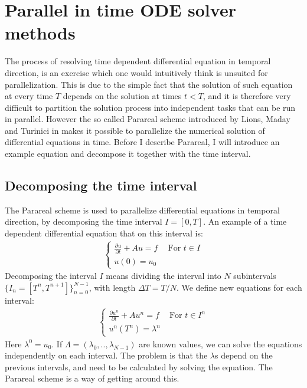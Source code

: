 \chapter{Parallel in time ODE solver methods} \label{parareal_chap}
The process of resolving time dependent differential equation in temporal direction, is an exercise which one would intuitively think is unsuited for parallelization. This is due to the simple fact that the solution of such equation at every time $T$ depends on the solution at times $t<T$, and it is therefore very difficult to partition the solution process into independent tasks that can be run in parallel. However the so called Parareal scheme introduced by Lions, Maday and Turinici in \cite{lions2001resolution} makes it possible to parallelize the numerical solution of differential equations in time. Before I describe Parareal, I will introduce an example equation and decompose it together with the time interval.
\section{Decomposing the time interval}
The Parareal scheme is used to parallelize differential equations in temporal direction, by decomposing the time interval $I=[0,T]$. An example of a time dependent differential equation that on this interval is:
\begin{align}
\left\{
   	\begin{array}{lr}
		\frac{\partial u}{\partial t} + Au = f \ \quad \textrm{For $t \in I$} \\
		u(0)=u_0
	\end{array}
   \right. \label{unbroken}
\end{align} 
Decomposing the interval $I$ means dividing the interval into $N$ subintervals $\{I_n = [T^{n},T^{n+1}]\}_{n=0}^{N-1}$, with length $\Delta T = T/N$. We define new equations for each interval:
\begin{align}
\left\{
     \begin{array}{lr}
		\frac{\partial u^n}{\partial t} + Au^n = f \ \quad \textrm{For $t \in I^n$} \\
		u^n(T^n)=\lambda^n
	\end{array}
	\right.	\label{broken}
\end{align}
Here $\lambda^0=u_0$. If $\Lambda=(\lambda_0,..,\lambda_{N-1})$ are known values, we can solve the equations independently on each interval. The problem is that the $\lambda$s depend on the previous intervals, and need to be calculated by solving the equation. The Parareal scheme is a way of getting around this.
